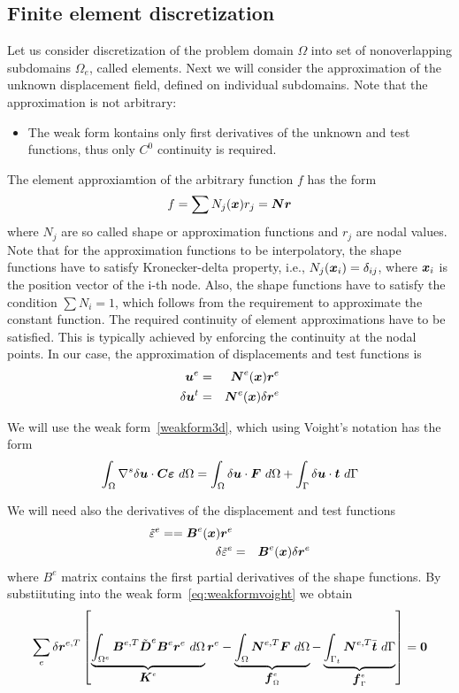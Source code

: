 \subsection{Finite element discretization}
Let us consider discretization of the problem domain $\Omega$ into set of nonoverlapping subdomains $\Omega_e$, called elements.
Next we will consider the approximation of the unknown displacement field, defined on individual subdomains. Note that the approximation is not arbitrary:
\begin{itemize}
  \item The weak form kontains only first derivatives of the unknown and test functions, thus only $C^0$ continuity is required.
\end{itemize}
The element approxiamtion of the arbitrary function $f$ has the form
$$
f = \sum N_j(\mbox{\boldmath$x$})r_j  = \mbox{\boldmath$N$}\mbox{\boldmath$r$}
$$
where $N_j$ are so called shape or approximation functions and $r_j$ are nodal values.
Note that for the approximation functions to be interpolatory, the shape functions have to satisfy Kronecker-delta property, i.e., $N_j(\mbox{\boldmath$x$}_i)=\delta_{ij}$, where $\mbox{\boldmath$x$}_i$ is the position vector of the i-th node. Also, the shape functions have to satisfy the condition $\sum N_i=1$, which follows from the requirement to approximate the constant function.
The required continuity of element approximations have to be satisfied. This is typically achieved by enforcing the continuity at the nodal points.
In our case, the approximation of displacements and test functions is
\begin{eqnarray}
  \mbox{\boldmath$u$}^e&=&\mbox{\boldmath$N$}^e(\mbox{\boldmath$x$})\mbox{\boldmath$r$}^e\\
  \delta\mbox{\boldmath$u$}^t&=&\mbox{\boldmath$N$}^e(\mbox{\boldmath$x$})\delta\mbox{\boldmath$r$}^e
\end{eqnarray}

We will use the weak form~\ref{weakform3d}, which using Voight's notation has the form
$$
  \int_\Omega\grad^s\delta\mbf{u}\cdot\mbf{C}\mbf{\eps}\ d\Omega =
  \int_\Omega\delta\mbf{u}\cdot\mbf{F}\ d\Omega + \int_\Gamma\delta\mbf{u}\cdot\mbf{t}\ d\Gamma
$$

  We will need also the derivatives of the displacement and test functions
  \begin{eqnarray}
  \tilde{\varepsilon}^e = = \mbox{\boldmath$B$}^e(\mbox{\boldmath$x$})\mbox{\boldmath$r$}^e\\
  \delta\tilde{\varepsilon}^e&=&\mbox{\boldmath$B$}^e(\mbox{\boldmath$x$})\delta\mbox{\boldmath$r$}^e
\end{eqnarray}
where $B^e$ matrix contains the first partial derivatives of the shape functions. 
By substiituting into the weak form~\ref{eq:weakformvoight} we obtain
\begin{equation}
  \sum_e \delta\mbf{r}^{e,T}
  \left[
    \underbrace{\int_{\Omega^e} \mbf{B}^{e,T}\tilde{\mbf{D}}^e\mbf{B}^e\mbf{r}^e\ d\Omega}_{\mbf{K}^e}\mbf{r}^e-\underbrace{\int_{\Omega}\mbf{N}^{e,T}\mbf{F}\ d\Omega}_{\mbf{f}^e_\Omega} - \underbrace{\int_{\Gamma_t}\mbf{N}^{e,T}\bar{\mbf{t}}\ d\Gamma}_{\mbf{f}^e_\Gamma}
    \right] = \mbf{0}
\end{equation}

